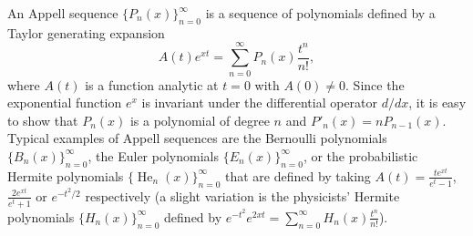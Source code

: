 \documentclass[a4paper]{amsart}
\theoremstyle{plain}
\theoremstyle{definition}
\theoremstyle{remark}
\numberwithin{equation}{section}
\begin{document}
An Appell sequence $\{P_n(x)\}_{n=0}^{\infty}$ is a sequence of polynomials defined by a Taylor generating expansion
\begin{equation}
\label{eq:As}
  A(t) e^{xt} = \sum_{n=0}^{\infty} P_n(x) \frac{t^n}{n!},
\end{equation}
where $A(t)$ is a function analytic at $t=0$ with $A(0) \ne 0$.
Since the exponential function $e^x$ is invariant under the differential operator ${d}/{dx}$, it is easy to show that $P_n(x)$ is a polynomial of degree $n$ and $P'_n(x) = nP_{n-1}(x)$. Typical examples of Appell sequences are the Bernoulli polynomials $\{B_n(x)\}_{n=0}^{\infty}$, the Euler polynomials $\{E_n(x)\}_{n=0}^{\infty}$, or the probabilistic Hermite polynomials $\{\operatorname{He}_n(x)\}_{n=0}^{\infty}$ that are defined by taking $A(t) = \frac{te^{xt}}{e^t -1}$, $\frac{2e^{xt}}{e^t +1}$ or $e^{-t^2/2}$ respectively (a slight variation is the physicists' Hermite polynomials $\{H_n(x)\}_{n=0}^{\infty}$ defined by $e^{-t^2}e^{2xt} = \sum_{n=0}^{\infty} H_n(x) \frac{t^n}{n!}$).
\end{document}
